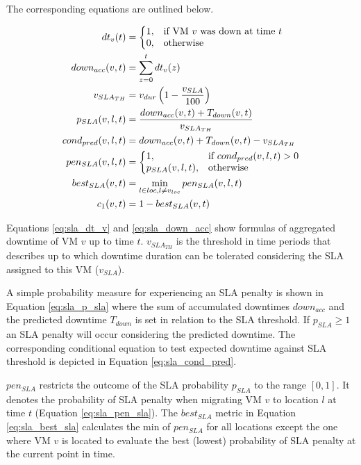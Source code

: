 The corresponding equations are outlined below. 

\begin{align}
	dt_v(t) &= \left\{
								\begin{array}{@{}ll@{}}
									1, & \text{if VM } v \text{ was down at time } t \\
									0, & \text{otherwise}
								\end{array}\right. \label{eq:sla_dt_v}\\
	down_{acc} (v,t) &= \sum_{z=0}^t dt_v(z) \label{eq:sla_down_acc}\\
	v_{SLA_{TH}} &= v_{dur} \left( 1 - \frac{v_{SLA}}{100} \right) \label{eq:sla_v_sla_th} \\
	p_{SLA} (v,l,t) &= \frac{down_{acc}(v,t) + T_{down}(v,t)}{v_{SLA_{TH}}} \label{eq:sla_p_sla}\\
	cond_{pred} (v,l,t) &= down_{acc}(v,t) + T_{down}(v,t) - v_{SLA_{TH}} \label{eq:sla_cond_pred}\\
	pen_{SLA} (v,l,t) &= \left\{
													\begin{array}{@{}ll@{}}
														1, & \text{if}\ cond_{pred} (v,l,t) > 0 \\
														p_{SLA} (v,l,t), & \text{otherwise}
													\end{array}\right. \label{eq:sla_pen_sla}\\
	best_{SLA} (v,t) &= \min_{l \in loc, l \neq v_{loc}} pen_{SLA} (v,l,t) \label{eq:sla_best_sla}\\
	c_1(v,t) &= 1 - best_{SLA} (v,t)  \label{eq:sla_c_1}
\end{align}

Equations \ref{eq:sla_dt_v} and \ref{eq:sla_down_acc} show formulas of aggregated downtime of VM $v$ up to time $t$. 
$v_{SLA_{TH}}$ is the threshold in time periods that describes up to which downtime duration can be tolerated considering the SLA assigned to this VM ($v_{SLA}$). 

A simple probability measure for experiencing an SLA penalty is shown in Equation \ref{eq:sla_p_sla} where the sum of accumulated downtimes $down_{acc}$ and the predicted downtime $T_{down}$ is set in relation to the SLA threshold. If $p_{SLA} \geq 1$ an SLA penalty will occur considering the predicted downtime. 
The corresponding conditional equation to test expected downtime against SLA threshold is depicted in Equation \ref{eq:sla_cond_pred}. 

$pen_{SLA}$ restricts the outcome of the SLA probability $p_{SLA}$ to the range $[0,1]$. It denotes the probability of SLA penalty when migrating VM $v$ to location $l$ at time $t$ (Equation \ref{eq:sla_pen_sla}). The $best_{SLA}$ metric in Equation \ref{eq:sla_best_sla} calculates the min of $pen_{SLA}$ for all locations except the one where VM $v$ is located to evaluate the best (lowest) probability of SLA penalty at the current point in time. 

